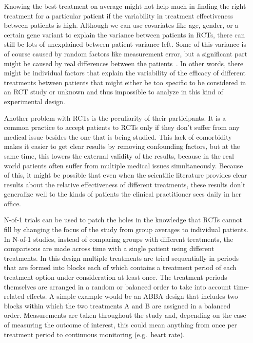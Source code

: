 \documentclass[12pt,a4paper,leqno]{report}
\theoremstyle{plain}
\theoremstyle{definition}
\theoremstyle{remark}
\begin{document}
Knowing the best treatment on average might not help much in finding the right
treatment for a particular patient if the variability in treatment effectiveness
between patients is high. Although we can use covariates like age, gender, or
a certain gene variant to explain the variance between patients in RCTs, there
can still be lots of unexplained between-patient variance left. Some
of this variance is of course caused by random factors like measurement error,
but a significant part might be caused by real differences between the patients\ \cite{HTE1, HTE2, HTE3, HTE4}.
In other words, there might be individual factors that explain the variability
of the efficacy of different treatments between patients that might either be
too specific to be considered in an RCT study or unknown and thus impossible to
analyze in this kind of experimental design.

Another problem with RCTs is the peculiarity of their participants. It is
a common practice to accept patients to RCTs only if they don't suffer from any
medical issue besides the one that is being studied. This lack of comorbidity
makes it easier to get clear results by removing confounding factors, but at the
same time, this lowers the external validity of the results, because in the real
world patients often suffer from multiple medical issues simultaneously. Because of this, it might be possible that even when the scientific
literature provides clear results about the relative effectiveness of different
treatments, these results don't generalize well to the kinds of
patients the clinical practitioner sees daily in her office.\ \cite{HTE1}

N-of-1 trials can be used to patch the holes in the knowledge that RCTs cannot
fill by changing the focus of the study from group averages to individual
patients. In N-of-1 studies, instead of comparing groups with different treatments,
the comparisons are made across time with a single patient using different
treatments. In this design multiple treatments are tried sequentially in periods
that are formed into blocks each of which contains a treatment period of each
treatment option under consideration at least once. The treatment periods themselves are
arranged in a random or balanced order to take
into account time-related effects. A simple example would be an ABBA design that
includes two blocks within which the two treatments A and B are assigned in a
balanced order. Measurements are taken throughout the study and, depending on the
ease of measuring the outcome of interest, this could mean anything from
once per treatment period to continuous monitoring (e.g.\ heart rate).
\end{document}
